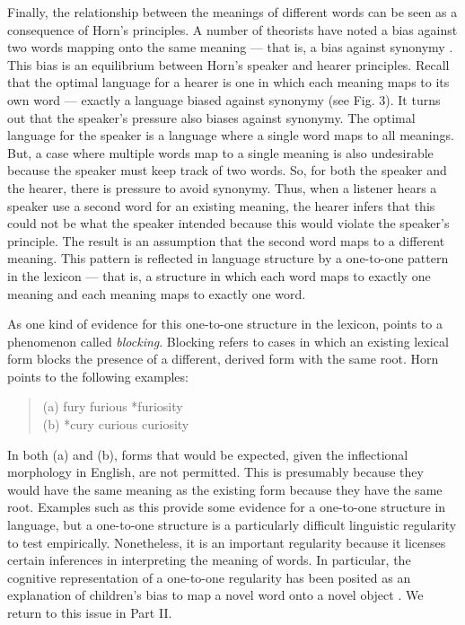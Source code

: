 \documentclass[man, noapacite, 12pt]{apa2}
\begin{document}
Finally, the relationship between the meanings of different words can be seen as a consequence of Horn's principles. A number of theorists have noted a bias against two words mapping onto the same meaning --- that is, a bias against synonymy \cite{saussure, kiparsky1983word, horn1984, clark1987principle, clark1988logic}. This bias is an equilibrium between Horn's speaker and hearer principles. Recall that the optimal language for a hearer is one in which each meaning maps to its own word --- exactly a language biased against synonymy (see Fig. 3). It turns out that the speaker's pressure also biases against synonymy.  The optimal language for the speaker is a language where a single word maps to all meanings. But, a case where multiple words map to a single meaning is also undesirable because the speaker must keep track of two words. So, for both the speaker and the hearer, there is pressure to avoid synonymy. Thus, when a listener hears a speaker use a second word for an existing meaning, the hearer infers that this could not be what the speaker intended because this would violate the speaker's principle. The result is an assumption that the second word maps to a different meaning. This pattern is reflected in language structure by a one-to-one pattern in the lexicon --- that is, a structure in which each word maps to exactly one meaning and each meaning maps to exactly one word.

As one kind of evidence for this one-to-one structure in the lexicon,  points to a phenomenon called {\it blocking}. Blocking refers to cases in which an existing lexical form blocks the presence of a different, derived form with the same root. Horn  points to the following examples:
 \begin{quote} 
 	(a) fury furious *furiosity\\
	(b) *cury curious curiosity 
\end{quote}
In both (a) and (b), forms that would be expected, given the inflectional morphology in English, are not permitted. This is presumably because they would have the same meaning as the existing form because they have the same root. Examples such as this provide some evidence for a one-to-one structure in language, but a one-to-one structure is a particularly difficult linguistic regularity to test empirically. Nonetheless, it is an important regularity because it licenses certain inferences in interpreting the meaning of words. In particular, the cognitive representation of a one-to-one regularity has been posited as an explanation of children's bias to map a novel word onto a novel object \cite{markman1988, markman2003}. We return to this issue in Part II.
\end{document}
